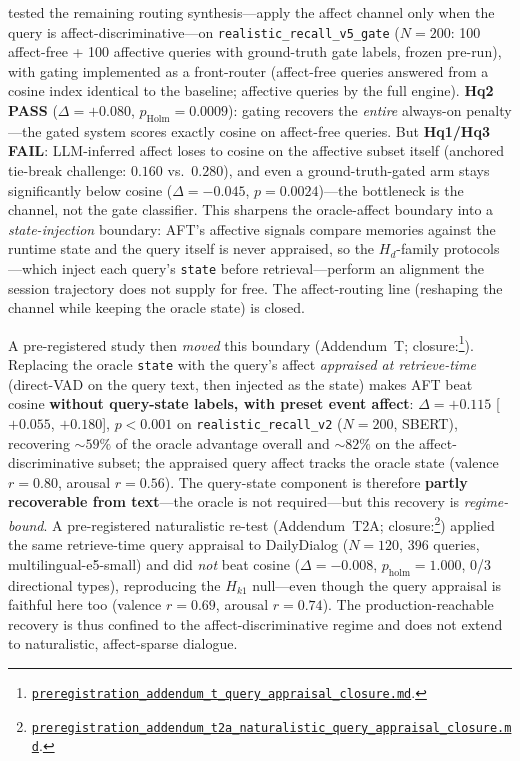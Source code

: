\documentclass[11pt]{article}
\newcommand{\repourl}{https://github.com/gianlucamazza/emotional-memory}%
\begin{document}
tested the remaining routing synthesis---apply the affect channel only when the
query is affect-discriminative---on \texttt{realistic\_recall\_v5\_gate}
($N=200$: 100 affect-free + 100 affective queries with ground-truth gate labels,
frozen pre-run), with gating implemented as a front-router (affect-free queries
answered from a cosine index identical to the baseline; affective queries by the
full engine). \textbf{Hq2 PASS} ($\Delta=+0.080$, $p_{\text{Holm}}=0.0009$):
gating recovers the \emph{entire} always-on penalty---the gated system scores
exactly cosine on affect-free queries. But \textbf{Hq1/Hq3 FAIL}: LLM-inferred
affect loses to cosine on the affective subset itself (anchored tie-break
challenge: $0.160$ vs.\ $0.280$), and even a ground-truth-gated arm stays
significantly below cosine ($\Delta=-0.045$, $p=0.0024$)---the bottleneck is the
channel, not the gate classifier. This sharpens the oracle-affect boundary into a
\emph{state-injection} boundary: AFT's affective signals compare memories against
the runtime state and the query itself is never appraised, so the $H_{d}$-family
protocols---which inject each query's \texttt{state} before retrieval---perform an
alignment the session trajectory does not supply for free. The affect-routing
line (reshaping the channel while keeping the oracle state) is closed.

A pre-registered study then \emph{moved} this boundary (Addendum~T; closure:\footnote{%
\href{\repourl/blob/main/benchmarks/preregistration\_addendum\_t\_query\_appraisal\_closure.md}%
{\texttt{preregistration\_addendum\_t\_query\_appraisal\_closure.md}}.}). Replacing the
oracle \texttt{state} with the query's affect \emph{appraised at retrieve-time}
(direct-VAD on the query text, then injected as the state) makes AFT beat cosine
\textbf{without query-state labels, with preset event affect}: $\Delta=+0.115$ [$+0.055$, $+0.180$], $p<0.001$ on
\texttt{realistic\_recall\_v2} ($N=200$, SBERT), recovering ${\sim}59\%$ of the oracle
advantage overall and ${\sim}82\%$ on the affect-discriminative subset; the appraised
query affect tracks the oracle state (valence $r=0.80$, arousal $r=0.56$). The
query-state component is therefore \textbf{partly recoverable from text}---the
oracle is not required---but this recovery is \emph{regime-bound}. A pre-registered
naturalistic re-test (Addendum~T2A; closure:\footnote{%
\href{\repourl/blob/main/benchmarks/preregistration\_addendum\_t2a\_naturalistic\_query\_appraisal\_closure.md}%
{\texttt{preregistration\_addendum\_t2a\_naturalistic\_query\_appraisal\_closure.md}}.}) applied
the same retrieve-time query appraisal to DailyDialog ($N=120$, 396 queries, multilingual-e5-small)
and did \emph{not} beat cosine ($\Delta=-0.008$, $p_{\mathrm{holm}}=1.000$, 0/3 directional
types), reproducing the $H_{k1}$ null---even though the query appraisal is faithful here too
(valence $r=0.69$, arousal $r=0.74$). The production-reachable recovery is thus confined to the
affect-discriminative regime and does not extend to naturalistic, affect-sparse dialogue.
\end{document}
